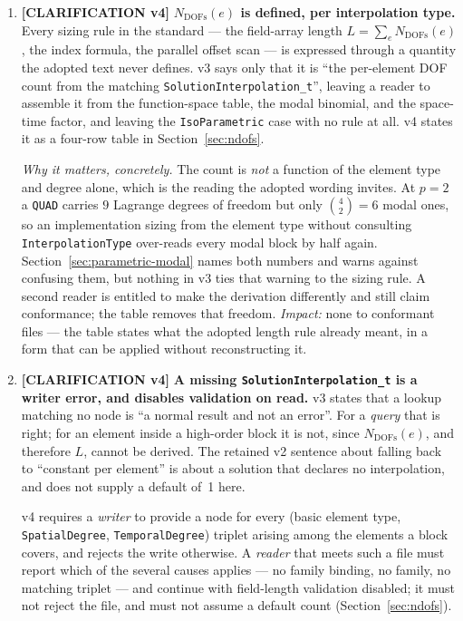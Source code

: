 \documentclass[11pt,letterpaper]{article}
\newif\ifvfourdraft
\newenvironment{v4block}{\ifvfourdraft\color{v4violet}\fi\ignorespaces}{\par}
\newcommand{\CLARIFYIV}{\ifvfourdraft
  \textcolor{v4violet}{\textbf{[CLARIFICATION v4]}}\else
  \textcolor{clarifybrown}{\textbf{[CLARIFICATION v4]}}\fi}
\begin{document}
{\begin{v4block}
\begin{enumerate}[leftmargin=1.4em,itemsep=0.5em]
  \item \CLARIFYIV{} \textbf{$N_\mathrm{DOFs}(e)$ is defined, per interpolation
    type.}  Every sizing rule in the standard --- the field-array length
    $L=\sum_e N_\mathrm{DOFs}(e)$, the index formula, the parallel offset scan ---
    is expressed through a quantity the adopted text never defines.  v3 says only
    that it is ``the per-element DOF count from the matching
    \texttt{SolutionInterpolation\_t}'', leaving a reader to assemble it from the
    function-space table, the modal binomial, and the space-time factor, and
    leaving the \texttt{IsoParametric} case with no rule at all.  v4 states it as
    a four-row table in Section~\ref{sec:ndofs}.

    \textit{Why it matters, concretely.}  The count is \emph{not} a function of
    the element type and degree alone, which is the reading the adopted wording
    invites.  At $p=2$ a \texttt{QUAD} carries $9$ Lagrange degrees of freedom but
    only $\binom{4}{2}=6$ modal ones, so an implementation sizing from the element
    type without consulting \texttt{InterpolationType} over-reads every modal
    block by half again.  Section~\ref{sec:parametric-modal} names both numbers
    and warns against confusing them, but nothing in v3 ties that warning to the
    sizing rule.  A second reader is entitled to make the derivation differently
    and still claim conformance; the table removes that freedom.
    \textit{Impact:} none to conformant files --- the table states what the
    adopted length rule already meant, in a form that can be applied without
    reconstructing it.

  \item \CLARIFYIV{} \textbf{A missing \texttt{SolutionInterpolation\_t} is a
    writer error, and disables validation on read.}  v3 states that a lookup
    matching no node is ``a normal result and not an error''.  For a \emph{query}
    that is right; for an element inside a high-order block it is not, since
    $N_\mathrm{DOFs}(e)$, and therefore $L$, cannot be derived.  The retained v2
    sentence about falling back to ``constant per element'' is about a solution
    that declares no interpolation, and does not supply a default of~1 here.

    v4 requires a \emph{writer} to provide a node for every (basic element type,
    \texttt{SpatialDegree}, \texttt{TemporalDegree}) triplet arising among the
    elements a block covers, and rejects the write otherwise.  A \emph{reader}
    that meets such a file must report which of the several causes applies ---
    no family binding, no family, no matching triplet --- and continue with
    field-length validation disabled; it must not reject the file, and must not
    assume a default count (Section~\ref{sec:ndofs}).


\end{enumerate}
\end{v4block}}
\end{document}
